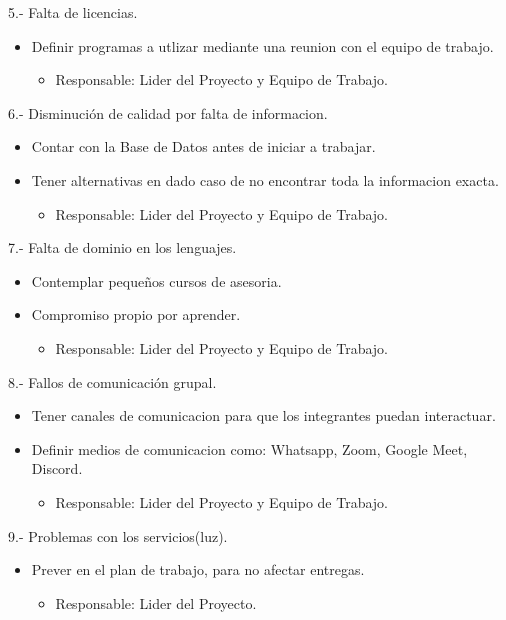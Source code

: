 \documentclass[40pt]{article}
\begin{document}
5.- Falta de licencias.
\begin{itemize}
    \item Definir programas a utlizar mediante una reunion con el equipo de trabajo.
    \begin{itemize}
      \item Responsable: Lider del Proyecto y Equipo de Trabajo.
    \end{itemize}  
\end{itemize}
6.- Disminución de calidad por falta de informacion.
\begin{itemize}
    \item Contar con la Base de Datos antes de iniciar a trabajar.
    \item Tener alternativas en dado caso de no encontrar toda la informacion exacta.
    \begin{itemize}
      \item Responsable: Lider del Proyecto y Equipo de Trabajo.
    \end{itemize}  
\end{itemize}
7.- Falta de dominio en los lenguajes.
\begin{itemize}
    \item Contemplar pequeños cursos de asesoria.
    \item Compromiso propio por aprender.
    \begin{itemize}
      \item Responsable: Lider del Proyecto y Equipo de Trabajo.
    \end{itemize}  
\end{itemize}
8.- Fallos de comunicación grupal.
\begin{itemize}
    \item Tener canales de comunicacion para que los integrantes puedan interactuar.
    \item Definir medios de comunicacion como: Whatsapp, Zoom, Google Meet, Discord.
    \begin{itemize}
      \item Responsable: Lider del Proyecto y Equipo de Trabajo.
    \end{itemize}  
\end{itemize}
9.- Problemas con los servicios(luz).
\begin{itemize}
    \item Prever en el plan de trabajo, para no afectar entregas.
    \begin{itemize}
      \item Responsable: Lider del Proyecto.
    \end{itemize}  
\end{itemize}
\end{document}
